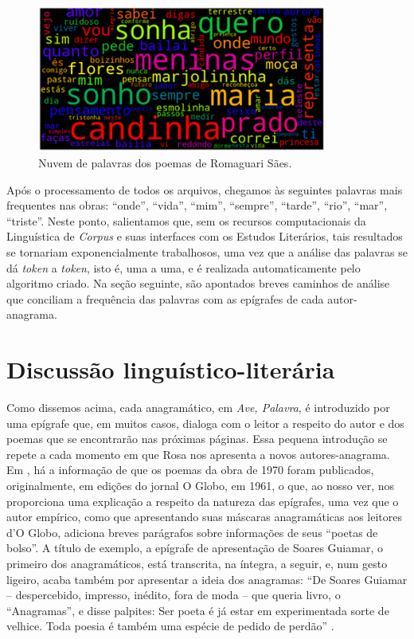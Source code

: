 \documentclass[portuguese]{textolivre}
\begin{document}
\begin{figure}[h!]
 \centering
 \includegraphics[width=0.85\textwidth]{fig-006.png}
 \caption{Nuvem de palavras dos poemas de Romaguari Sães.}
 \label{fig06}
\end{figure}

Após o processamento de todos os arquivos, chegamos às seguintes palavras mais frequentes nas obras: “onde”, “vida”, “mim”, “sempre”, “tarde”, “rio”, “mar”, “triste”. Neste ponto, salientamos que, sem os recursos computacionais da Linguística de \textit{Corpus} e suas interfaces com os Estudos Literários, tais resultados se tornariam exponencialmente trabalhosos, uma vez que a análise das palavras se dá \textit{token} a \textit{token}, isto é, uma a uma, e é realizada automaticamente pelo algoritmo criado. Na seção seguinte, são apontados breves caminhos de análise que conciliam a frequência das palavras com as epígrafes de cada autor-anagrama. 

\section{Discussão linguístico-literária}\label{sec-fmt-manuscrito}
Como dissemos acima, cada anagramático, em \textit{Ave, Palavra}, é introduzido por uma epígrafe que, em muitos casos, dialoga com o leitor a respeito do autor e dos poemas que se encontrarão nas próximas páginas. Essa pequena introdução se repete a cada momento em que Rosa nos apresenta a novos autores-anagrama. Em \textcite{brito_aspectos_2012}, há a informação de que os poemas da obra de 1970 foram publicados, originalmente, em edições do jornal O Globo, em 1961, o que, ao nosso ver, nos proporciona uma explicação a respeito da natureza das epígrafes, uma vez que o autor empírico, como que apresentando suas máscaras anagramáticas aos leitores d’O Globo, adiciona breves parágrafos sobre informações de seus “poetas de bolso”. A título de exemplo, a epígrafe de apresentação de Soares Guiamar, o primeiro dos anagramáticos, está transcrita, na íntegra, a seguir, e, num gesto ligeiro, acaba também por apresentar a ideia dos anagramas: “De Soares Guiamar – despercebido, impresso, inédito, fora de moda – que queria livro, o “Anagramas”, e disse palpites: Ser poeta é já estar em experimentada sorte de velhice. Toda poesia é também uma espécie de pedido de perdão” \cite[p. 58]{rosa_ave_1985}. 
\end{document}
